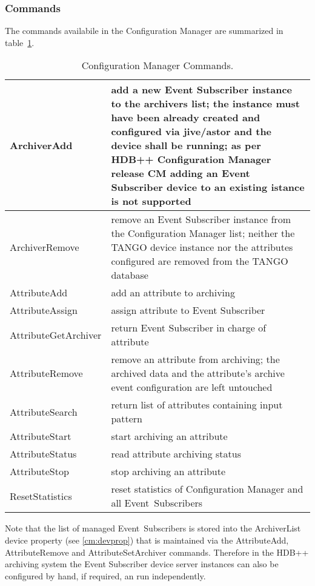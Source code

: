 \documentclass[11pt,a4paper]{article}
\def \hdb{HDB++}
\def \es{Event Subscriber}
\def \cm{Configuration Manager}
\def \cmrel{CM}
\def \tango{TANGO}
\begin{document}
\subsubsection{Commands}
\label{cm:commands}
The commands availabile in the \cm{} are summarized in
table~\ref{cm:commands-table}.
\begin{table}[H]
	\begin{tabular}{p{}|p{}}
		\hline
		ArchiverAdd &
		add a new \es{} instance to the archivers list; the instance
		must have been already created and configured via jive/astor
		and the device shall be running; as per \hdb{}
		\cm{} release {\color{red}\cmrel} adding an \es{} device to an
		existing istance is not supported \\
		\hline
		ArchiverRemove &
		remove an \es{} instance from the \cm{} list; neither the \tango{}
		device instance nor the attributes configured are removed from
		the \tango{} database \\
		\hline
		AttributeAdd & add an attribute to archiving \\
		\hline
		AttributeAssign & assign attribute to \es \\
		\hline
		AttributeGetArchiver & return \es{} in charge of attribute \\
		\hline
		AttributeRemove &
		remove an attribute from archiving; the archived data
		and the attribute's archive event configuration are left
		untouched \\
		\hline
		AttributeSearch &
		return list of attributes containing input pattern \\
		\hline
		AttributeStart & start archiving an attribute \\
		\hline
		AttributeStatus & read attribute archiving status \\
		\hline
		AttributeStop & stop archiving an attribute \\
		\hline
		ResetStatistics & reset statistics of \cm{} and all \mbox{\es s} \\
		\hline
	\end{tabular}
	\caption{\cm{} Commands.}
	\label{cm:commands-table}
\end{table}
Note that the list of managed \mbox{\es s} is stored into the ArchiverList
device property (see \ref{cm:devprop}) that is maintained via the
AttributeAdd, AttributeRemove and AttributeSetArchiver commands.
Therefore in the \hdb{} archiving system the \es{} device server
instances can also be configured by hand, if required, an run
independently.
\end{document}
